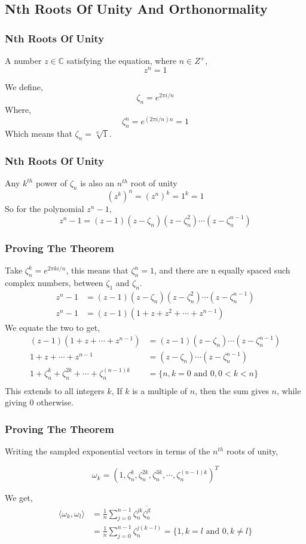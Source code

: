 \documentclass{beamer}
\begin{document}
\subsection{Nth Roots Of Unity And Orthonormality}
\begin{frame}
	\frametitle{Nth Roots Of Unity}
	\begin{definition}
	A number $z \in \mathbb{C}$ satisfying the equation, where $n \in Z^+$,
	\[
	z^n = 1
	\]
	\end{definition}
	\pause
	We define,
	\[
		\zeta_n = e^{2\pi i /n}
	\]
	Where,
	\[
		\zeta_n^n = e^{(2 \pi i / n)n} = 1
	\]
	\pause
	Which means that $\zeta_n = \sqrt[n]{1}$.
\end{frame}
\begin{frame}
	\frametitle{Nth Roots Of Unity}	
	Any $k^{th}$ power of $\zeta_n$ is also an $n^{th}$ root of unity
	\[
	(z^k)^n = (z^n)^k = 1^k = 1
\]
\pause
So for the polynomial $z^n - 1$,
\[
		z^{n}-1 = (z-1)(z -  \zeta_n)(z-\zeta_n^2)\cdots(z - \zeta_n^{n-1}) 
\]
\end{frame}
\begin{frame}
\frametitle{Proving The Theorem}
		Take $\zeta_n^k = e^{2\pi k i/n}$, this means that $\zeta^n_n = 1$, and there are n equally spaced such complex numbers, between $\zeta_1$ and $\zeta_n$.
	\begin{align*}
		z^{n}-1 &= (z-1)(z -  \zeta_n)(z-\zeta_n^2)\cdots(z - \zeta_n^{n-1}) \\
		z^n-1 &= (z-1)(1 + z + z^2 + \cdots + z^{n-1}) 
	\end{align*}
	\pause
	We equate the two to get,
	\begin{align*}
	(z-1)(1 + z + \cdots + z^{n-1})  &= (z-1)(z -  \zeta_n)\cdots(z - \zeta_n^{n-1}) \\
	1 + z + \cdots + z^{n-1}  &= (z -  \zeta_n)\cdots(z - \zeta_n^{n-1}) \\
		1 + \zeta_n^k + \zeta_n^{2k} + \cdots + \zeta_n^{(n-1) k} &= \{n,k = 0 \text{ and } 0, 0 < k < n \} \\
	\end{align*}
\pause	
This extends to all integers $k$, If $k$ is a multiple of $n$, then the sum gives $n$, while giving 0 otherwise.
\end{frame}
\begin{frame}
	\frametitle{Proving The Theorem}
	Writing the sampled exponential vectors in terms of the $n^{th}$ roots of unity,

\[
	\omega_k = (1, \zeta_n^k, \zeta_n^{2k},\zeta_n^{3k}, \cdots, \zeta_n^{(n-1)k})^T
\]
\pause

We get, 
\begin{align*}
	\langle	\omega_k, \omega_l \rangle &= \frac{1}{n} \sum_{j=0}^{n-1} \zeta_{n}^{jk} \overline{\zeta_{n}^{jl}} \\
	&= \frac{1}{n} \sum_{j=0}^{n-1} \zeta_n^{j(k-l)} = \{1, k = l \text{ and } 0, k \neq l\}
\end{align*}
\end{frame}
\end{document}
